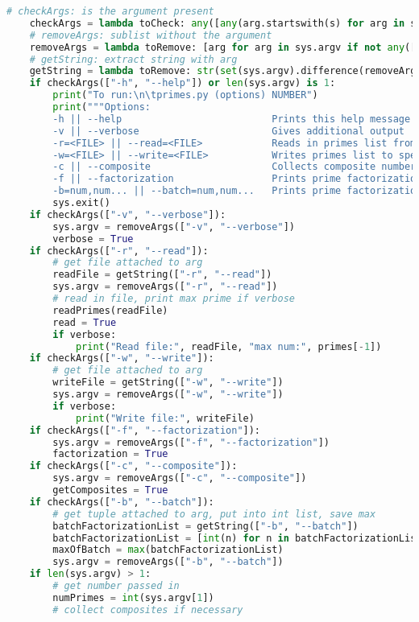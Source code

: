 \documentclass[11pt, twoside, reqno]{book}
\begin{document}
\begin{lstlisting}[language=Python]
    # checkArgs: is the argument present
    checkArgs = lambda toCheck: any([any(arg.startswith(s) for arg in sys.argv) for s in toCheck])
    # removeArgs: sublist without the argument
    removeArgs = lambda toRemove: [arg for arg in sys.argv if not any([arg.startswith(s) for s in toRemove])]
    # getString: extract string with arg
    getString = lambda toRemove: str(set(sys.argv).difference(removeArgs(toRemove)).pop()).split('=', 1)[1]
    if checkArgs(["-h", "--help"]) or len(sys.argv) is 1:
        print("To run:\n\tprimes.py (options) NUMBER")
        print("""Options:
        -h || --help                          Prints this help message
        -v || --verbose                       Gives additional output
        -r=<FILE> || --read=<FILE>            Reads in primes list from specified file (JSON)
        -w=<FILE> || --write=<FILE>           Writes primes list to specified file (JSON)
        -c || --composite                     Collects composite numbers also
        -f || --factorization                 Prints prime factorization of NUMBER
        -b=num,num... || --batch=num,num...   Prints prime factorization of num,num,num...""")
        sys.exit()
    if checkArgs(["-v", "--verbose"]):
        sys.argv = removeArgs(["-v", "--verbose"])
        verbose = True
    if checkArgs(["-r", "--read"]):
        # get file attached to arg
        readFile = getString(["-r", "--read"])
        sys.argv = removeArgs(["-r", "--read"])
        # read in file, print max prime if verbose
        readPrimes(readFile)
        read = True
        if verbose:
            print("Read file:", readFile, "max num:", primes[-1])
    if checkArgs(["-w", "--write"]):
        # get file attached to arg
        writeFile = getString(["-w", "--write"])
        sys.argv = removeArgs(["-w", "--write"])
        if verbose:
            print("Write file:", writeFile)
    if checkArgs(["-f", "--factorization"]):
        sys.argv = removeArgs(["-f", "--factorization"])
        factorization = True
    if checkArgs(["-c", "--composite"]):
        sys.argv = removeArgs(["-c", "--composite"])
        getComposites = True
    if checkArgs(["-b", "--batch"]):
        # get tuple attached to arg, put into int list, save max
        batchFactorizationList = getString(["-b", "--batch"])
        batchFactorizationList = [int(n) for n in batchFactorizationList.split(",")]
        maxOfBatch = max(batchFactorizationList)
        sys.argv = removeArgs(["-b", "--batch"])
    if len(sys.argv) > 1:
        # get number passed in
        numPrimes = int(sys.argv[1])
        # collect composites if necessary

\end{lstlisting}
\end{document}

